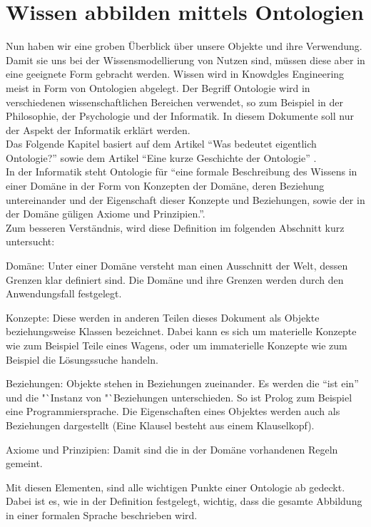 \chapter{Wissen abbilden mittels Ontologien}
\label{chap:ontologien}

Nun haben wir eine groben Überblick über unsere Objekte und ihre Verwendung. Damit sie uns bei der Wissensmodellierung von Nutzen sind, müssen diese aber in eine geeignete Form gebracht werden. Wissen wird in Knowdgles Engineering meist in Form von Ontologien abgelegt. 
Der Begriff Ontologie wird in verschiedenen wissenschaftlichen Bereichen verwendet, so zum Beispiel in der Philosophie, der Psychologie und der Informatik. In diesem Dokumente soll nur der Aspekt der Informatik erklärt werden. \\
Das Folgende Kapitel basiert auf dem Artikel "`Was bedeutet eigentlich Ontologie?"'\cite{IspekOntoBedeutung} sowie dem Artikel "`Eine kurze Geschichte der Ontologie"' \cite{ISpekOntoGeschichte}.\\
In der Informatik steht Ontologie für "`eine formale Beschreibung des Wissens in einer Domäne in der Form von Konzepten der Domäne, deren Beziehung untereinander und der Eigenschaft dieser Konzepte und Beziehungen, sowie der in der Domäne güligen Axiome und Prinzipien."'\cite[S.310]{ISpekOntoGeschichte}.\\
Zum besseren Verständnis, wird diese Definition im folgenden Abschnitt kurz untersucht:

Domäne: Unter einer Domäne versteht man einen Ausschnitt der Welt, dessen Grenzen klar definiert sind. Die Domäne und ihre Grenzen werden durch den Anwendungsfall festgelegt.

Konzepte: Diese werden in anderen Teilen dieses Dokument als Objekte beziehungsweise Klassen bezeichnet. Dabei kann es sich um materielle Konzepte wie zum Beispiel Teile eines Wagens, oder um immaterielle Konzepte wie zum Beispiel die Lösungssuche handeln.

Beziehungen: Objekte stehen in Beziehungen zueinander. Es werden die "`ist ein"' und die "`Instanz von "`Beziehungen unterschieden. So ist Prolog zum Beispiel eine Programmiersprache. Die Eigenschaften eines Objektes werden auch als Beziehungen dargestellt (Eine Klausel besteht aus einem Klauselkopf).

Axiome und Prinzipien: Damit sind die in der Domäne vorhandenen Regeln gemeint.

Mit diesen Elementen, sind alle wichtigen Punkte einer Ontologie ab gedeckt. Dabei ist es, wie in der Definition festgelegt, wichtig, dass die gesamte Abbildung in einer formalen Sprache beschrieben wird.


